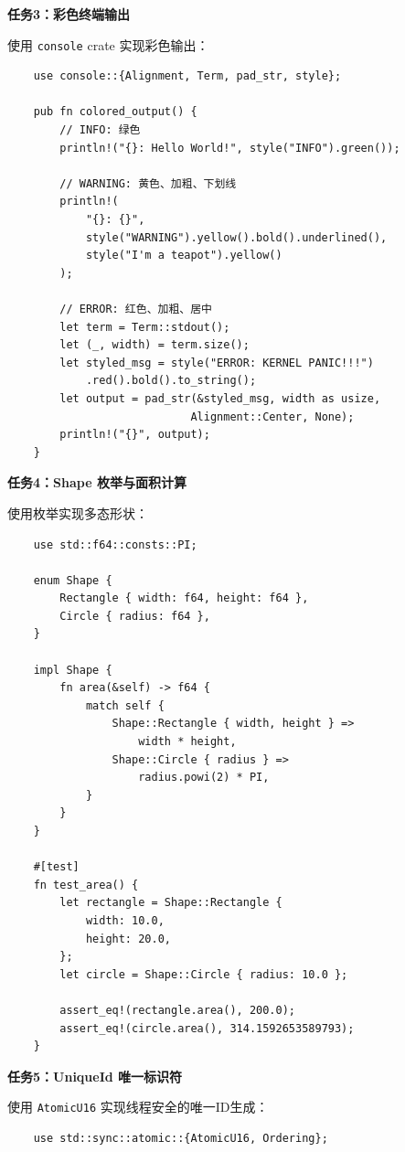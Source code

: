 \documentclass{SYSUReport}
\begin{document}
\begin{enumerate}[label={\chinese*、},labelsep=0pt]
    \textbf{任务3：彩色终端输出}
    
    使用 \texttt{console} crate 实现彩色输出：
    \begin{verbatim}
    use console::{Alignment, Term, pad_str, style};

    pub fn colored_output() {
        // INFO: 绿色
        println!("{}: Hello World!", style("INFO").green());
        
        // WARNING: 黄色、加粗、下划线
        println!(
            "{}: {}",
            style("WARNING").yellow().bold().underlined(),
            style("I'm a teapot").yellow()
        );
        
        // ERROR: 红色、加粗、居中
        let term = Term::stdout();
        let (_, width) = term.size();
        let styled_msg = style("ERROR: KERNEL PANIC!!!")
            .red().bold().to_string();
        let output = pad_str(&styled_msg, width as usize, 
                            Alignment::Center, None);
        println!("{}", output);
    }
    \end{verbatim}
    
    \textbf{任务4：Shape 枚举与面积计算}
    
    使用枚举实现多态形状：
    \begin{verbatim}
    use std::f64::consts::PI;

    enum Shape {
        Rectangle { width: f64, height: f64 },
        Circle { radius: f64 },
    }

    impl Shape {
        fn area(&self) -> f64 {
            match self {
                Shape::Rectangle { width, height } => 
                    width * height,
                Shape::Circle { radius } => 
                    radius.powi(2) * PI,
            }
        }
    }

    #[test]
    fn test_area() {
        let rectangle = Shape::Rectangle {
            width: 10.0,
            height: 20.0,
        };
        let circle = Shape::Circle { radius: 10.0 };
        
        assert_eq!(rectangle.area(), 200.0);
        assert_eq!(circle.area(), 314.1592653589793);
    }
    \end{verbatim}
    
    \textbf{任务5：UniqueId 唯一标识符}
    
    使用 \texttt{AtomicU16} 实现线程安全的唯一ID生成：
    \begin{verbatim}
    use std::sync::atomic::{AtomicU16, Ordering};


\end{verbatim}
\end{enumerate}
\end{document}
